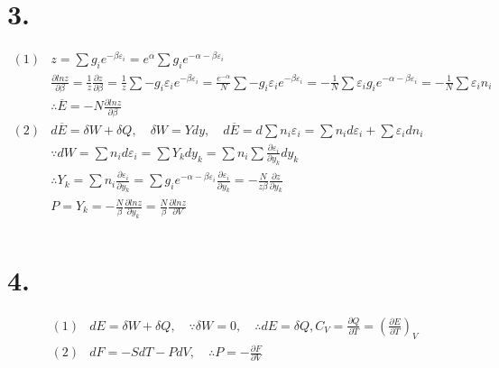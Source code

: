 \documentclass[UTF8]{ctexart}
\begin{document}
\section*{3.}
\begin{equation*}
  \begin{aligned}
    (1) & z=\sum g_ie^{-\beta\varepsilon_i}=e^\alpha\sum g_ie^{-\alpha-\beta\varepsilon
    _i}                                                                                   \\
        & \frac{\partial lnz}{\partial\beta}=\frac{1}{z}\frac{\partial z}{\partial\beta}
    =\frac{1}{z}\sum-g_i\varepsilon_ie^{-\beta\varepsilon_i}=\frac{e^{-\alpha}}{N}\sum
    -g_i\varepsilon_ie^{-\beta\varepsilon_i}=-\frac{1}{N}\sum\varepsilon_i g_i
    e^{-\alpha-\beta\varepsilon_i}=-\frac{1}{N}\sum\varepsilon_in_i                       \\
        & \therefore\overline{E}=-N\frac{\partial lnz}{\partial\beta}                     \\
    (2) & d\overline{E}=\delta W+\delta Q,\quad\delta W=Ydy,\quad d\overline{E}=d\sum n_i
    \varepsilon_i=\sum n_id\varepsilon_i+\sum\varepsilon_idn_i                            \\
        & \because dW=\sum n_id\varepsilon_i=\sum Y_kdy_k=\sum n_i\sum\frac{\partial
    \varepsilon_i}{\partial y_k}dy_k                                                      \\
        & \therefore Y_k=\sum n_i\frac{\partial\varepsilon_i}{\partial y_k}=\sum g_ie^
    {-\alpha-\beta\varepsilon_i}\frac{\partial\varepsilon_i}{\partial y_k}=-\frac{N}
    {z\beta}\frac{\partial z}{\partial y_k}                                               \\
        & P=Y_k=-\frac{N}{\beta}\frac{\partial lnz}{\partial y_k}=\frac{N}{\beta}\frac
    {\partial lnz}{\partial V}                                                            \\
  \end{aligned}
\end{equation*}
\section*{4.}
\begin{equation*}
  \begin{aligned}
    (1) & dE=\delta W+\delta Q,\quad\because\delta W=0,\quad\therefore dE=\delta Q,C_V=
    \frac{\partial Q}{\partial T}=(\frac{\partial E}{\partial T})_V                     \\
    (2) & dF=-SdT-PdV,\quad\therefore P=-\frac{\partial F}{\partial V}
  \end{aligned}
\end{equation*}
\end{document}

